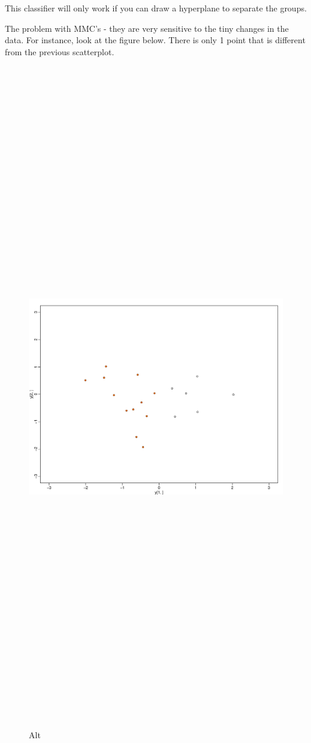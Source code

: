 \documentclass[
]{article}
\begin{document}
This classifier will only work if you can draw a hyperplane to separate
the groups.

The problem with MMC's - they are very sensitive to the tiny changes in
the data. For instance, look at the figure below. There is only 1 point
that is different from the previous scatterplot.

\begin{figure}
\centering
\includegraphics[width=1\textwidth,height=12.5in]{MMConepointmore.pdf}
\caption{Alt}
\end{figure}
\end{document}
